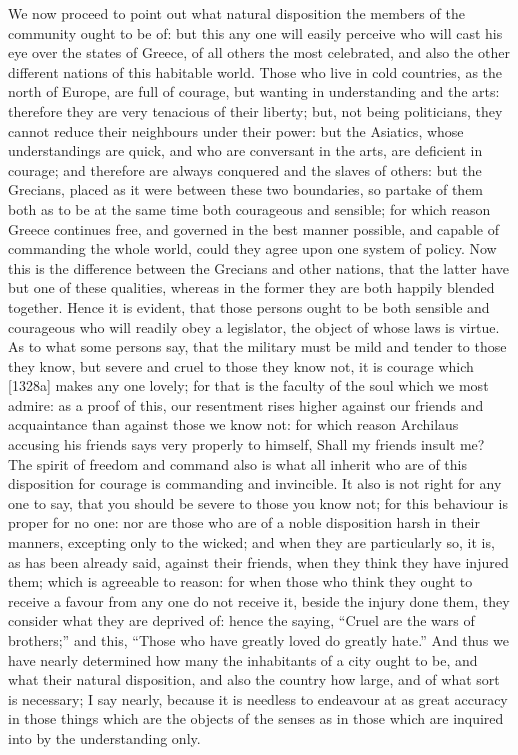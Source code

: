 
We now proceed to point out what natural disposition the members of the
community ought to be of: but this any one will easily perceive who will
cast his eye over the states of Greece, of all others the most celebrated,
and also the other different nations of this habitable world. Those who
live in cold countries, as the north of Europe, are full of courage, but
wanting in understanding and the arts: therefore they are very tenacious
of their liberty; but, not being politicians, they cannot reduce their
neighbours under their power: but the Asiatics, whose understandings are
quick, and who are conversant in the arts, are deficient in courage; and
therefore are always conquered and the slaves of others: but the Grecians,
placed as it were between these two boundaries, so partake of them both as
to be at the same time both courageous and sensible; for which reason
Greece continues free, and governed in the best manner possible, and
capable of commanding the whole world, could they agree upon one system of
policy. Now this is the difference between the Grecians and other nations,
that the latter have but one of these qualities, whereas in the former
they are both happily blended together. Hence it is evident, that those
persons ought to be both sensible and courageous who will readily obey a
legislator, the object of whose laws is virtue. As to what some persons
say, that the military must be mild and tender to those they know, but
severe and cruel to those they know not, it is courage which [1328a] makes
any one lovely; for that is the faculty of the soul which we most admire:
as a proof of this, our resentment rises higher against our friends and
acquaintance than against those we know not: for which reason Archilaus
accusing his friends says very properly to himself, Shall my friends
insult me? The spirit of freedom and command also is what all inherit who
are of this disposition for courage is commanding and invincible. It also
is not right for any one to say, that you should be severe to those you
know not; for this behaviour is proper for no one: nor are those who are
of a noble disposition harsh in their manners, excepting only to the
wicked; and when they are particularly so, it is, as has been already
said, against their friends, when they think they have injured them; which
is agreeable to reason: for when those who think they ought to receive a
favour from any one do not receive it, beside the injury done them, they
consider what they are deprived of: hence the saying, ``Cruel are the wars
of brothers;'' and this, ``Those who have greatly loved do greatly hate.''
And thus we have nearly determined how many the inhabitants of a city
ought to be, and what their natural disposition, and also the country how
large, and of what sort is necessary; I say nearly, because it is needless
to endeavour at as great accuracy in those things which are the objects of
the senses as in those which are inquired into by the understanding only.


